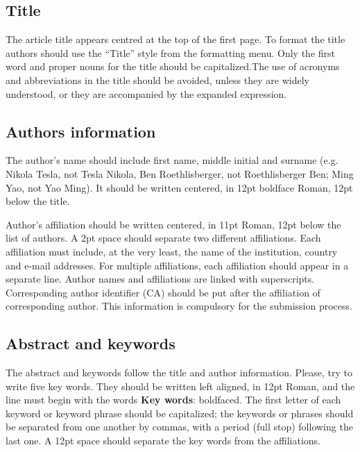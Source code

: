 \documentclass{ECOS_2021}
\begin{document}
\sffamily \large \subsection{Title} \label{Title}
\rmfamily \normalsize
The article title appears centred at the top of the first page. To format the title authors should use the “Title” style from the formatting menu. Only the first word and proper nouns for the title should be capitalized.The  use  of  acronyms  and  abbreviations  in  the  title  should  be  avoided,  unless  they  are widely understood, or they are accompanied by the expanded expression.

\sffamily \large \subsection{Authors information} \label{Authors information}
\rmfamily \normalsize
The author's name should include first name, middle initial and
surname (e.g. Nikola Tesla, not Tesla Nikola, Ben Roethlisberger, not Roethlisberger Ben; Ming Yao, not Yao Ming). It should be written centered, in 12pt boldface Roman,
12pt below the title.

Author's affiliation should be written centered, in 11pt Roman, 12pt below the list of authors. A 2pt space should separate two different affiliations. Each affiliation must include, at the very least, the name of the institution, country and e-mail addresses. For multiple affiliations, each affiliation should appear in a separate line. Author names and affiliations are linked with superscripts. Corresponding author identifier (CA) should be put after the affiliation of corresponding author. This information is compulsory for the submission process.

\sffamily \large \subsection{Abstract and keywords} \label{Abstract and keywords}
\rmfamily \normalsize
The abstract and keywords follow the title and author information. Please, try to write five key words. They should be written left aligned, in 12pt Roman, and the line must begin with the words {\bf Key words}: boldfaced. The first letter of each keyword or keyword phrase should be capitalized; the keywords or phrases should be separated from one another by commas, with a period (full stop) following the last one. A 12pt space should separate the key words from the affiliations.
\end{document}

